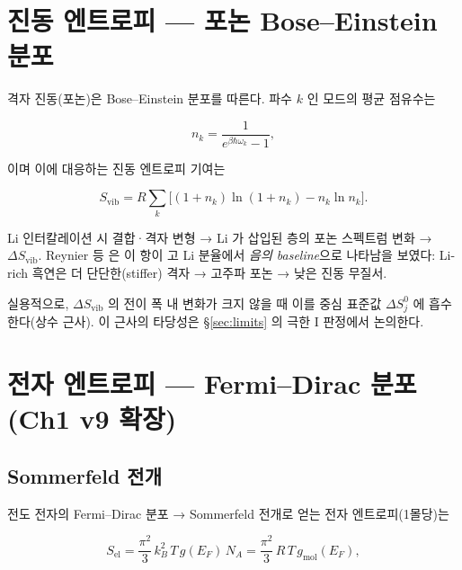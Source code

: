 \documentclass[11pt,a4paper]{article}
\newcommand{\vib}{\mathrm{vib}}
\newcommand{\elec}{\mathrm{el}}
\begin{document}
\section{진동 엔트로피 — 포논 Bose--Einstein 분포}\label{sec:vibrational}

격자 진동(포논)은 Bose--Einstein 분포를 따른다. 파수 $k$ 인 모드의 평균 점유수는

\begin{equation}
  n_k = \frac{1}{e^{\beta\hbar\omega_k} - 1},
  \label{eq:BE}
\end{equation}

이며 이에 대응하는 진동 엔트로피 기여는

\begin{equation}
  S_\vib = R\sum_k \bigl[(1+n_k)\ln(1+n_k) - n_k\ln n_k\bigr].
  \label{eq:Svib}
\end{equation}

Li 인터칼레이션 시 결합·격자 변형 → Li 가 삽입된 층의 포논 스펙트럼 변화 → $\Delta S_\vib$.
Reynier 등 \cite{reynier2003} 은 이 항이 고 Li 분율에서 \emph{음의 baseline}으로 나타남을
보였다: Li-rich 흑연은 더 단단한(stiffer) 격자 → 고주파 포논 → 낮은 진동 무질서.

실용적으로, $\Delta S_\vib$ 의 전이 폭 내 변화가 크지 않을 때 이를 중심 표준값 $\Delta S^0_j$ 에
흡수한다(상수 근사). 이 근사의 타당성은 §\ref{sec:limits} 의 극한 I 판정에서 논의한다.

\section{전자 엔트로피 — Fermi--Dirac 분포 (Ch1 v9 확장)}\label{sec:electronic}

\subsection{Sommerfeld 전개}

전도 전자의 Fermi--Dirac 분포 → Sommerfeld 전개로 얻는 전자 엔트로피(1몰당)는

\begin{equation}
  S_\elec = \frac{\pi^2}{3}\,k_B^2\,T\,g(E_F)\,N_A
  = \frac{\pi^2}{3}\,R\,T\,g_\mathrm{mol}(E_F),
  \label{eq:Sel}
\end{equation}
\end{document}
